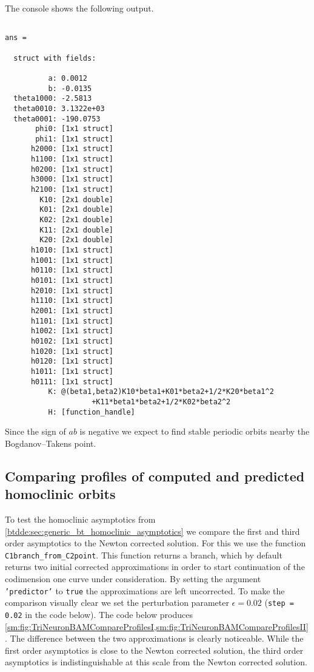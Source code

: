 The \MATLAB console shows the following output.
\begin{verbatim}

ans =

  struct with fields:

          a: 0.0012
          b: -0.0135
  theta1000: -2.5813
  theta0010: 3.1322e+03
  theta0001: -190.0753
       phi0: [1x1 struct]
       phi1: [1x1 struct]
      h2000: [1x1 struct]
      h1100: [1x1 struct]
      h0200: [1x1 struct]
      h3000: [1x1 struct]
      h2100: [1x1 struct]
        K10: [2x1 double]
        K01: [2x1 double]
        K02: [2x1 double]
        K11: [2x1 double]
        K20: [2x1 double]
      h1010: [1x1 struct]
      h1001: [1x1 struct]
      h0110: [1x1 struct]
      h0101: [1x1 struct]
      h2010: [1x1 struct]
      h1110: [1x1 struct]
      h2001: [1x1 struct]
      h1101: [1x1 struct]
      h1002: [1x1 struct]
      h0102: [1x1 struct]
      h1020: [1x1 struct]
      h0120: [1x1 struct]
      h1011: [1x1 struct]
      h0111: [1x1 struct]
          K: @(beta1,beta2)K10*beta1+K01*beta2+1/2*K20*beta1^2
                    +K11*beta1*beta2+1/2*K02*beta2^2
          H: [function_handle]

\end{verbatim}
Since the sign of $ab$ is negative we expect to find stable periodic orbits nearby the 
Bogdanov--Takens point.

\subsection{Comparing profiles of computed and predicted homoclinic orbits}
To test the homoclinic asymptotics from
\cref{btdde:sec:generic_bt_homoclinic_asymptotics} we compare the first and third
order asymptotics to the Newton corrected solution. For this we use the 
function \texttt{C1branch_from_C2point}. This function returns a branch, which
by default returns two initial corrected approximations in order to start continuation of the
codimension one curve under consideration. By setting the argument
\texttt{'predictor'} to \texttt{true} the approximations are left uncorrected.
To make the comparison visually clear we set the perturbation parameter 
$\epsilon=0.02$ (\texttt{step = 0.02} in the code below).
The code below produces \cref{sm:fig:TriNeuronBAMCompareProfilesI,sm:fig:TriNeuronBAMCompareProfilesII}.
The difference between the two approximations is clearly noticeable. While
the first order asymptotics is close to the Newton corrected solution, the third
order asymptotics is indistinguishable at this scale from the Newton corrected
solution.
\inputminted[firstline=57, lastline=81]{MATLAB}{\pathToDDEBifToolDemos/BAM_neural_network_model/BAMnn.m}

